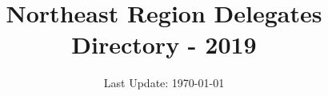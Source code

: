 \documentclass[letterpaper,12pt]{report}
\title{\bf{Northeast Region Delegates Directory - 2019}}
\date{Last Update: \today}
\begin{document}
\begin{titlepage}
\maketitle
\end{titlepage}


\end{document}
